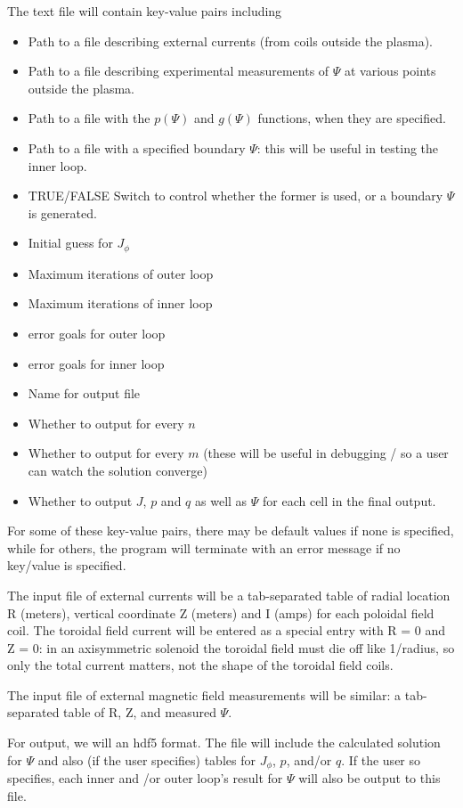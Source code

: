 \documentclass[paper=a4, fontsize=11pt]{scrartcl} %
\begin{document}
The text file will contain key-value pairs including
\begin{itemize}
\item Path to a file describing external currents (from coils outside the plasma).
\item Path to a file describing experimental measurements of $\Psi$ at various points outside the plasma.
\item Path to a file with the $p(\Psi)$ and $g(\Psi)$ functions, when they are specified.
\item Path to a file with a specified boundary $\Psi$: this will be useful in testing the inner loop.
\item TRUE/FALSE Switch to control whether the former is used, or a boundary $\Psi$ is generated.
\item Initial guess for $J_\phi$
\item Maximum iterations of outer loop
\item Maximum iterations of inner loop
\item error goals for outer loop
\item error goals for inner loop
\item Name for output file
\item Whether to output for every $n$
\item Whether to output for every $m$ (these will be useful in debugging / so a user can watch the solution converge)
\item Whether to output $J$, $p$ and $q$ as well as $\Psi$ for each cell in the final output.
\end{itemize}

For some of these key-value pairs, there may be default values if none is specified, while for others, the program will terminate with an error message if no key/value is specified.

The input file of external currents will be a tab-separated table of radial location R (meters), vertical coordinate Z (meters) and I (amps) for each poloidal field coil. The toroidal field current will be entered as a special entry with R = 0 and Z = 0: in an axisymmetric solenoid the toroidal field must die off like 1/radius, so only the total current matters, not the shape of the toroidal field coils.

The input file of external magnetic field measurements will be similar: a tab-separated table of R, Z, and measured $\Psi$.

For output, we will an hdf5 format. The file will include the calculated solution for $\Psi$ and also (if the user specifies) tables for $J_\phi$, $p$, and/or $q$. If the user so specifies, each inner and /or outer loop's result for $\Psi$ will also be output to this file.
\end{document}
